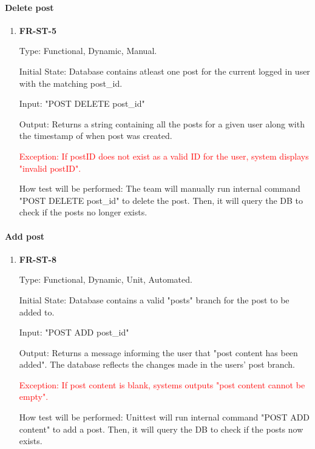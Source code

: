 \documentclass[12pt, titlepage]{article}
\begin{document}
\paragraph{Delete post}	
\begin{enumerate}
\item{\textbf{FR-ST-5}}

Type: Functional, Dynamic, Manual.
					
Initial State: Database contains atleast one post for the current logged in user with the matching post\_id.
					
Input: "POST DELETE post\_id"
					
Output: Returns a string containing all the posts for a given user along with the timestamp of when post was created.

\textcolor{red}{Exception: If postID does not exist as a valid ID for the user, system displays "invalid postID".}
					
How test will be performed: The team will manually run internal command "POST DELETE post\_id" to delete the post. Then, it will query the DB to check if the posts no longer exists.
\end{enumerate}

\paragraph{Add post}	
\begin{enumerate}
\item{\textbf{FR-ST-8}}

Type: Functional, Dynamic, Unit, Automated.
					
Initial State: Database contains a valid "posts" branch for the post to be added to.
					
Input: "POST ADD post\_id"
					
Output: Returns a message informing the user that "post content has been added". The database reflects the changes made in the users' post branch.

\textcolor{red}{Exception: If post content is blank, systems outputs "post content cannot be empty".}
					
How test will be performed: Unittest will run internal command "POST ADD content" to add a post. Then, it will query the DB to check if the posts now exists.
\end{enumerate}
\end{document}
